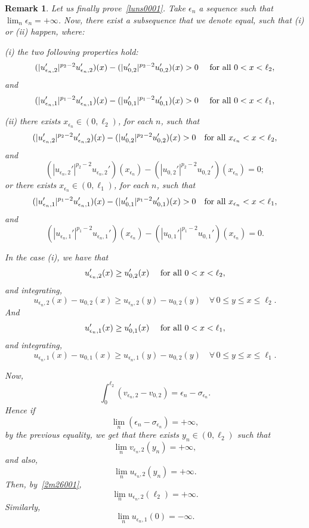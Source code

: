 \documentclass[reqno,12pt]{amsart}
\newtheorem{remark}[theorem]{Remark}
\numberwithin{equation}{section} %
\begin{document}
\begin{remark}
  Let us finally prove~\eqref{luns0001}. 
Take $\epsilon_n$ a sequence such that $\lim_n\epsilon_n=+\infty$. Now, there exist a subsequence that we denote equal,  such that (i) or (ii) happen, where:

\noindent (i) the two following properties hold:
$$(|u_{\epsilon_n,2}'|^{p_{2}-2}u_{\epsilon_n,2}')(x)
 -(|u_{0,2}'|^{p_{2}-2}u_{0,2}')(x)>0\quad\hbox{ for all } 0<x<\ell_2,$$
and
$$(|u_{\epsilon_n,1}'|^{p_{1}-2}u_{\epsilon_n,1}')(x)
 -(|u_{0,1}'|^{p_{1}-2}u_{0,1}')(x)>0\quad\hbox{ for all } 0<x<\ell_1,$$



\noindent (ii) there exists $x_{\epsilon_n}\in (0,\ell_2)$, for each $n$, such that $$(|u_{\epsilon_n,2}'|^{p_{2}-2}u_{\epsilon_n,2}')(x)
 -(|u_{0,2}'|^{p_{2}-2}u_{0,2}')(x)>0\quad\hbox{for all }x_{\epsilon_n}<x<\ell_2,$$
 and 
 $$(|u_{\epsilon_n,2}'|^{p_{2}-2}u_{\epsilon_n,2}')(x_{\epsilon_n})
 -(|u_{0,2}'|^{p_{2}-2}u_{0,2}')(x_{\epsilon_n})=0;$$
 or there exists $x_{\epsilon_n}\in (0,\ell_1)$, for each $n$, such that $$(|u_{\epsilon_n,1}'|^{p_{1}-2}u_{\epsilon_n,1}')(x)
 -(|u_{0,1}'|^{p_{1}-2}u_{0,1}')(x)>0\quad\hbox{for all }x_{\epsilon_n}<x<\ell_1,$$
 and 
 $$(|u_{\epsilon_n,1}'|^{p_{1}-2}u_{\epsilon_n,1}')(x_{\epsilon_n})
 -(|u_{0,1}'|^{p_{1}-2}u_{0,1}')(x_{\epsilon_n})=0.$$

In the case (i), we have that $$u_{\epsilon_n,2}'(x)\ge u_{0,2}'(x) \quad\hbox{ for all } 0<x<\ell_2,$$
and integrating,
\begin{equation}\label{2m26001}
u_{\epsilon_n,2}(x)-u_{0,2}(x)\ge u_{\epsilon_n,2}(y)-u_{0,2}(y)\quad\forall\, 0\le y\le x\le\ell_2.
\end{equation}
And $$u_{\epsilon_n,1}'(x)\ge u_{0,1}'(x) \quad\hbox{ for all } 0<x<\ell_1,$$
and integrating,
\begin{equation}\label{2m26001p1}
u_{\epsilon_n,1}(x)- u_{0,1}(x)\ge u_{\epsilon_n,1}(y)-u_{0,2}(y)\quad\forall\, 0\le y\le x\le\ell_1.
\end{equation}

Now,
$$\int_0^{\ell_2}(v_{\epsilon_n,2}-v_{0,2})=\epsilon_n-\sigma_{\epsilon_n}.$$
Hence if $$\lim_n(\epsilon_n-\sigma_{\epsilon_n})=+\infty,$$ by the previous equality, we get that there exists $ y_{n}\in (0,\ell_2)$ such that
$$\lim_n v_{\epsilon_n,2}(y_n)=+\infty,$$
and also,
$$\lim_n u_{\epsilon_n,2}(y_n)=+\infty.$$
Then, by~\eqref{2m26001},
$$\lim_n u_{\epsilon_n,2}(\ell_2)=+\infty.$$
Similarly, 
$$\lim_n u_{\epsilon_n,1}(0)=-\infty.$$


\end{remark}
\end{document}
